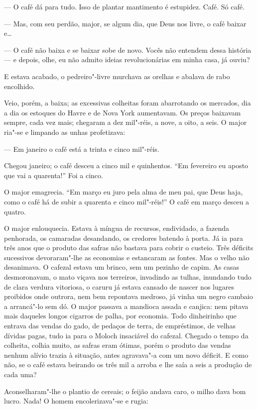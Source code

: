 --- O café dá para tudo. Isso de plantar mantimento é estupidez. Café.
Só café.

--- Mas, com seu perdão, major, se algum dia, que Deus nos livre, o café
baixar e\ldots{}

--- O café não baixa e se baixar sobe de novo. Vocês não entendem dessa
história --- e depois, olhe, eu não admito ideias revolucionárias em
minha casa, já ouviu?

E estava acabado, o pedreiro"-livre murchava as orelhas e abalava de rabo
encolhido.

Veio, porém, a baixa; as excessivas colheitas foram abarrotando os
mercados, dia a dia os estoques do Havre e de Nova York aumentavam. Os
preços baixavam sempre, cada vez mais; chegaram a dez mil"-réis, a nove,
a oito, a seis. O major ria"-se e limpando as unhas profetizava:

--- Em janeiro o café está a trinta e cinco mil"-réis.

Chegou janeiro; o café desceu a cinco mil e quinhentos. ``Em fevereiro
eu aposto que vai a quarenta!'' Foi a cinco.

O major emagrecia. ``Em março eu juro pela alma de meu pai, que Deus
haja, como o café há de subir a quarenta e cinco mil"-réis!'' O café em
março desceu a quatro.

O major enlouquecia. Estava à míngua de recursos, endividado, a fazenda
penhorada, os camaradas desandando, os credores batendo à porta. Já ia
para três anos que o produto das safras não bastava para cobrir o
custeio. Três déficits sucessivos devoraram"-lhe as economias e
estancaram as fontes. Mas o velho não desanimava. O cafezal estava um
brinco, sem um pezinho de capim. As casas desmoronavam, o mato viçava
nos terreiros, invadindo as tulhas, inundando tudo de clara verdura
vitoriosa, o caruru já estava cansado de nascer nos lugares proibidos
onde outrora, nem bem repontava medroso, já vinha um negro cambaio a
arrancá"-lo sem dó. O major passava a mandioca assada e canjica: nem
pitava mais daqueles longos cigarros de palha, por economia. Todo
dinheirinho que entrava das vendas do gado, de pedaços de terra, de
empréstimos, de velhas dívidas pagas, tudo ia para o Moloch insaciável
do cafezal. Chegado o tempo da colheita, colhia muito, as safras eram
ótimas, porém o produto das vendas nenhum alívio trazia à situação,
antes agravava"-a com um novo déficit. E como não, se o café estava
beirando os três mil a arroba e lhe saía a seis a produção de cada uma?

Aconselharam"-lhe o plantio de cereais; o feijão andava caro, o milho
dava bom lucro. Nada! O homem encolerizava"-se e rugia:

